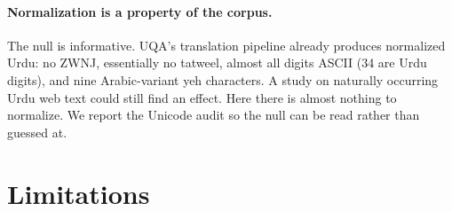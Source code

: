 \documentclass[11pt]{article}
\begin{document}
\paragraph{Normalization is a property of the corpus.}
The null is informative. UQA's translation pipeline already produces normalized Urdu: no ZWNJ,
essentially no tatweel, almost all digits ASCII (34 are Urdu digits), and nine Arabic-variant yeh characters. A study on
naturally occurring Urdu web text could still find an effect. Here there is almost nothing to
normalize. We report the Unicode audit so the null can be read rather than guessed at.

\section{Limitations}
\end{document}

